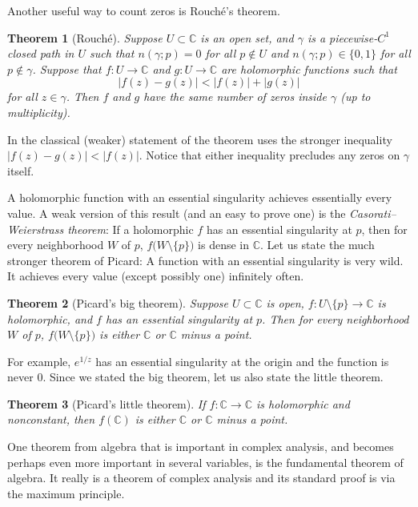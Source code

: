 \documentclass[12pt,openany]{book}
\newcommand{\sabs}[1]{\lvert {#1} \rvert}
\newcommand{\C}{{\mathbb{C}}}
\newcommand{\myindex}[1]{#1\index{#1}}
\theoremstyle{plain}
\newtheorem{thm}{Theorem}[section]
\theoremstyle{remark}
\theoremstyle{definition}
\theoremstyle{exercise}
\theoremstyle{example}
\begin{document}
Another useful way to count zeros is Rouch\'e's theorem.

\begin{thm}[Rouch\'e]\label{thm:onevarrouche}
Suppose $U \subset \C$ is an open set, and $\gamma$ is a piecewise-$C^1$
closed path in $U$ such that
$n(\gamma;p)=0$ for all $p \notin U$ and $n(\gamma;p) \in \{ 0,1 \}$ for
all $p \notin \gamma$.
Suppose that $f \colon U \to \C$ and $g \colon U \to \C$
are holomorphic functions such that
\begin{equation*}
\sabs{f(z)-g(z)} < \sabs{f(z)}+\sabs{g(z)}
\end{equation*}
for all $z \in \gamma$.  Then $f$ and $g$
have the same number of zeros
inside $\gamma$ (up to multiplicity).
\end{thm}

In the classical (weaker) statement of the theorem uses
the stronger inequality $\sabs{f(z)-g(z)} < \sabs{f(z)}$.
Notice that either inequality precludes any zeros on $\gamma$ itself.

A holomorphic function with an essential singularity achieves essentially
every value.  A weak version of this result (and an easy to prove one)
is the \emph{\myindex{Casorati--Weierstrass theorem}}:
If a holomorphic $f$ has an essential singularity at $p$,
then for every neighborhood $W$ of $p$, $f\bigl(W \setminus \{p\}\bigr)$ is dense in
$\C$.  Let us state the much stronger theorem of Picard:
A function with an essential singularity is very wild.
It achieves every value (except possibly one) infinitely often.

\begin{thm}[Picard's big theorem]
Suppose $U \subset \C$ is open, $f \colon U \setminus \{ p \} \to \C$
is holomorphic, and $f$ has an essential singularity at $p$.  Then for every
neighborhood $W$ of $p$, $f\bigl(W \setminus \{ p \}\bigr)$ is either $\C$
or $\C$ minus a point.
\end{thm}

For example, $e^{1/z}$ has an essential singularity at the origin
and the function is never $0$.
Since we stated the big theorem, let us also state the little theorem.

\begin{thm}[Picard's little theorem]
If $f \colon \C \to \C$ is holomorphic and nonconstant,
then
$f(\C)$ is either $\C$ or $\C$ minus a point.
\end{thm}


One theorem from algebra that is important in complex analysis, and becomes
perhaps even more important in several variables, is the fundamental theorem
of algebra.  It really is a theorem of complex analysis and its standard
proof is via the maximum principle.
\end{document}
